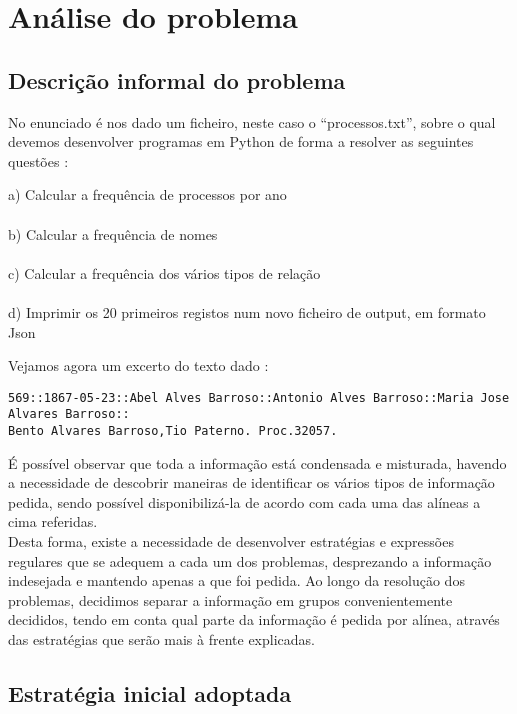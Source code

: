 \documentclass[11pt,a4paper]{report}%
\begin{document}
\chapter{Análise do problema} \label{chap:analiseEspecificacao} %
\section{Descrição informal do problema} \label{sec:descricaoProblema} %

No enunciado é nos dado um ficheiro, neste caso o “processos.txt”, sobre o qual devemos desenvolver programas em Python de forma a resolver as seguintes questões :\\
\begin{enumerate}
a)	Calcular a frequência de processos por ano\\
\\
b)	Calcular a frequência de nomes\\
\\
c)	Calcular a frequência dos vários tipos de relação\\
\\
d)	Imprimir os 20 primeiros registos num novo ficheiro de output, em formato Json\\
\end{enumerate}

Vejamos agora um excerto do texto dado :
\begin{verbatim}
569::1867-05-23::Abel Alves Barroso::Antonio Alves Barroso::Maria Jose Alvares Barroso::
Bento Alvares Barroso,Tio Paterno. Proc.32057.
\end{verbatim}
É possível observar que toda a informação está condensada e misturada, havendo a necessidade de descobrir maneiras de identificar os vários tipos de informação pedida, sendo possível disponibilizá-la de acordo com cada uma das alíneas a cima referidas.\\
Desta forma, existe a necessidade de desenvolver estratégias e expressões regulares que se adequem a cada um dos problemas, desprezando a informação indesejada e mantendo apenas a que foi pedida.
Ao longo da resolução dos problemas, decidimos separar a informação em grupos convenientemente decididos, tendo em conta qual parte da informação é pedida por alínea, através das estratégias que serão mais à frente explicadas.

\newpage

\section{Estratégia inicial adoptada} \label{sec:estrategiaAdoptada}
\end{document}

